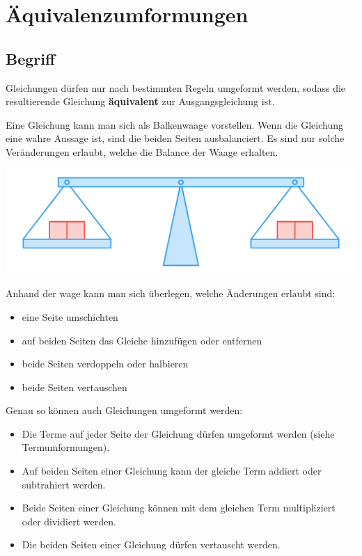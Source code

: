 \newpage
\section{Äquivalenzumformungen}

\subsection{Begriff}
Gleichungen dürfen nur nach bestimmten Regeln umgeformt werden, sodass die resultierende Gleichung \textbf{äquivalent} zur Ausgangsgleichung ist.

Eine Gleichung kann man sich als Balkenwaage vorstellen. Wenn die Gleichung eine wahre Aussage ist, sind die beiden Seiten ausbalanciert. Es sind nur solche Veränderungen erlaubt, welche die Balance der Waage erhalten.
\begin{center}
  \includegraphics[height=4cm]{Waage.pdf}
\end{center}

Anhand der wage kann man sich überlegen, welche Änderungen erlaubt sind:

\begin{itemize}
  \item eine Seite umschichten
  \item auf beiden Seiten das Gleiche hinzufügen oder entfernen
  \item beide Seiten verdoppeln oder halbieren
  \item beide Seiten vertauschen
\end{itemize}

Genau so können auch Gleichungen umgeformt werden:

\begin{itemize}
  \item Die Terme auf jeder Seite der Gleichung dürfen umgeformt werden (siehe Termumformungen).
  \item Auf beiden Seiten einer Gleichung kann der gleiche Term addiert oder subtrahiert werden.
  \item Beide Seiten einer Gleichung können mit dem gleichen Term multipliziert oder dividiert werden.
  \item Die beiden Seiten einer Gleichung dürfen vertauscht werden.
\end{itemize}

